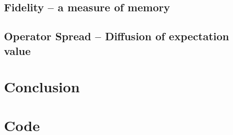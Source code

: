 \documentclass[11pt, oneside]{scrbook}
\begin{document}
\section{Fidelity -- a measure of memory}

\section{Operator Spread -- Diffusion of expectation value}

\chapter{Conclusion}

\appendix

\chapter{Code}

\backmatter
\printbibliography[heading=bibintoc, title=Bibliography]
\end{document}
